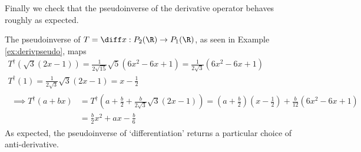 % 

Finally we check that the pseudoinverse of the derivative operator behaves roughly as expected.

\begin{example}{}{}
The pseudoinverse of $T=\diff x:P_2(\R)\to P_1(\R)$, as seen in Example \ref{ex:derivpseudo}, maps
\begin{gather*}
T^\dag(\sqrt 3(2x-1))=\frac 1{2\sqrt{15}}\sqrt 5(6x^2-6x+1) =\frac 1{2\sqrt 3}(6x^2-6x+1)\\
T^\dag(1)=\frac 1{2\sqrt 3}\sqrt 3(2x-1)=x-\frac 12\\
\begin{aligned}
\implies T^\dag(a+bx)&=T^\dag\left(a+\frac b2+\frac b{2\sqrt 3}\sqrt 3(2x-1)\right) =\left(a+\frac b2\right)\left(x-\frac 12\right)+\frac b{12}(6x^2-6x+1)\\
&=\frac b2x^2+ax-\frac b6
\end{aligned}
\end{gather*}
As expected, the pseudoinverse of `differentiation' returns a particular choice of anti-derivative.
\end{example}

